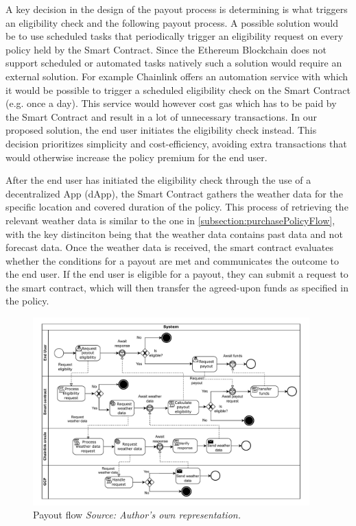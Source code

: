 A key decision in the design of the payout process is determining is what triggers an eligibility check and the following payout process. A possible solution would be to use scheduled tasks that periodically trigger an eligibility request on every policy held by the Smart Contract. Since the Ethereum Blockchain does not support scheduled or automated tasks natively such a solution would require an external solution. For example Chainlink offers an automation service \autocite{chainlink_automation} with which it would be possible to trigger a scheduled eligibility check on the Smart Contract (e.g. once a day). This service would however cost gas which has to be paid by the Smart Contract and result in a lot of unnecessary transactions. In our proposed solution, the end user initiates the eligibility check instead. This decision prioritizes simplicity and cost-efficiency, avoiding extra transactions that would otherwise increase the policy premium for the end user.

After the end user has initiated the eligibility check through the use of a decentralized App (dApp), the Smart Contract gathers the weather data for the specific location and covered duration of the policy. This process of retrieving the relevant weather data is similar to the one in \cref{subsection:purchasePolicyFlow}, with the key distinciton being that the weather data contains past data and not forecast data. Once the weather data is received, the smart contract evaluates whether the conditions for a payout are met and communicates the outcome to the end user. If the end user is eligible for a payout, they can submit a request to the smart contract, which will then transfer the agreed-upon funds as specified in the policy.


\begin{figure}[h]
    \centering
    \includegraphics[width=0.95\textwidth]{figures/flow-policy-payout-trigger.drawio.pdf}
    \caption{Payout flow \textit{Source: Author's own representation.}}
    \label{fig:payoutFlow}
\end{figure}

